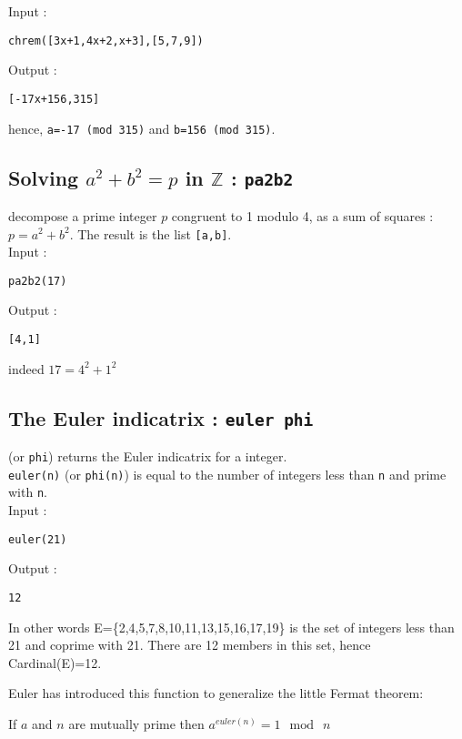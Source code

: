 \documentclass[a4paper,11pt]{book}
\newcommand{\Z}{{\mathbb{Z}}}
\begin{document}
Input :
\begin{center}{\tt chrem([3x+1,4x+2,x+3],[5,7,9])}\end{center}
Output :
\begin{center}{\tt [-17x+156,315] }\end{center}
hence, {\tt a=-17 (mod 315)} and {\tt b=156 (mod 315)}.

\subsection{Solving $a^2+b^2=p$ in $\Z$ : {\tt pa2b2}}
 decompose a prime integer $p$ congruent to 1 modulo 4, 
as a sum of squares : $p= a^2+b^2$.
The result is the list {\tt [a,b]}.\\
Input :
\begin{center}{\tt pa2b2(17)}\end{center}
Output :
\begin{center}{\tt [4,1] }\end{center}
indeed $17=4^2+1^2$

\subsection{The Euler indicatrix : {\tt euler phi}}
 (or {\tt phi}) returns the Euler indicatrix 
for a integer. \\
{\tt euler(n)} (or {\tt phi(n)}) is equal to the number of integers less 
than  {\tt n} and prime with {\tt n}. \\
Input :
\begin{center}{\tt euler(21)}\end{center}
Output :
\begin{center}{\tt 12}\end{center}
In other words
 E=\{2,4,5,7,8,10,11,13,15,16,17,19\} is the set of integers less than 21 
and coprime with 21. There are 12 members in this set, hence Cardinal(E)=12.

Euler has introduced this function to generalize the little Fermat theorem:\\
\centerline{If $a$ and $n$ are mutually prime then $a^{euler(n)}=1\ \bmod \ n$}
\end{document}
